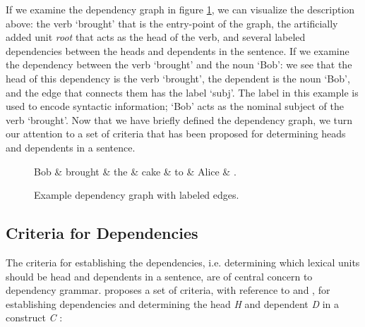 If we examine the dependency graph in figure \ref{dep1}, we can visualize the description above: the verb `brought' that is the entry-point of the graph, the artificially added unit \textit{root} that acts as the head of the verb, and several labeled dependencies between the heads and dependents in the sentence. If we examine the dependency between the verb `brought' and the noun `Bob': we see that the head of this dependency is the verb `brought', the dependent is the noun `Bob', and the edge that connects them has the label `subj'. The label in this example is used to encode syntactic information; `Bob' acts as the nominal subject of the verb `brought'. Now that we have briefly defined the dependency graph, we turn our attention to a set of criteria that has been proposed for determining heads and dependents in a sentence.

\begin{figure}
    \centering
    \begin{dependency}[]
        \begin{deptext}[column sep=1em, row sep=.1ex]
            Bob \& brought \& the \& cake \& to \& Alice \& . \\
        \end{deptext}
    \end{dependency}
    \caption{Example dependency graph with labeled edges.}
    \label{dep1}
\end{figure}

\subsection{Criteria for Dependencies}
\label{criteria}

The criteria for establishing the dependencies, i.e. determining which lexical units should be head and dependents in a sentence, are of central concern to dependency grammar.  proposes a set of criteria, with reference to \citeauthor{Zwicky:85} and \citeauthor{Hudson:90}, for establishing dependencies and determining the head \textit{H} and dependent \textit{D} in a construct \textit{C} \cite{Zwicky:85, Hudson:90, Niv:05}:

